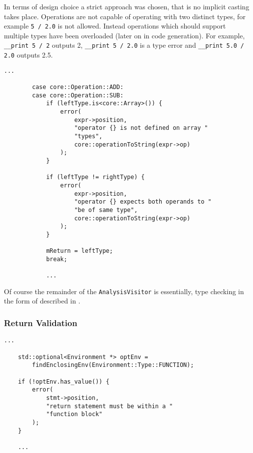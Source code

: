 In terms of design choice a strict approach was chosen, that is
no implicit casting takes place. Operations are not capable of
operating with two distinct types, for example \texttt{5 / 2.0}
is not allowed. Instead operations which should support multiple
types have been overloaded (later on in code generation). For
example, \texttt{__print 5 / 2} outputs 2, \texttt{__print 5 /
2.0} is a type error and \texttt{__print 5.0 / 2.0} outputs 2.5.

\begin{lstlisting}[caption={Another part of the
\texttt{visit(Binary *)} method in the \texttt{AnalysisVisitor}
class (analysis/AnalysisVisitor.cpp)},label=lst:typechecking2]
        ...

        case core::Operation::ADD:
        case core::Operation::SUB:
            if (leftType.is<core::Array>()) {
                error(
                    expr->position,
                    "operator {} is not defined on array "
                    "types",
                    core::operationToString(expr->op)
                );
            }

            if (leftType != rightType) {
                error(
                    expr->position,
                    "operator {} expects both operands to "
                    "be of same type",
                    core::operationToString(expr->op)
                );
            }

            mReturn = leftType;
            break;

            ...
\end{lstlisting}

Of course the remainder of the \texttt{AnalysisVisitor}
is essentially, type checking in the form of described
in .

\subsubsection{Return Validation}

\begin{lstlisting}[caption={Checking whether return statement is
inside a function declaration in the \texttt{visit(ReturnStmt
*)} method in the \texttt{AnalysisVisitor} class
(analysis/AnalysisVisitor.cpp)},label=lst:returninsidefunc]
    ...

    std::optional<Environment *> optEnv =
        findEnclosingEnv(Environment::Type::FUNCTION);

    if (!optEnv.has_value()) {
        error(
            stmt->position,
            "return statement must be within a "
            "function block"
        );
    }

    ...
\end{lstlisting}

